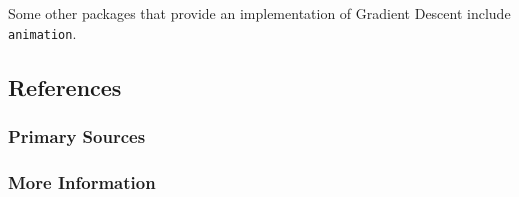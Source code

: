 Some other packages that provide an implementation of Gradient Descent include \texttt{animation}.


\subsection{References}

\subsubsection{Primary Sources}


\subsubsection{More Information}




